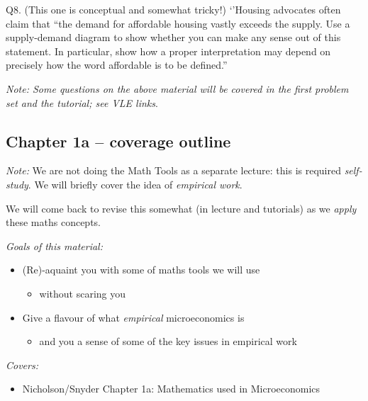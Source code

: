 \documentclass[]{article}
\providecommand{\tightlist}{%
  \setlength{\itemsep}{0pt}\setlength{\parskip}{0pt}}
\begin{document}
Q8. (This one is conceptual and somewhat tricky!) `'Housing advocates
often claim that ``the demand for affordable housing vastly exceeds the
supply. Use a supply-demand diagram to show whether you can make any
sense out of this statement. In particular, show how a proper
interpretation may depend on precisely how the word affordable is to be
defined.''

\emph{Note: Some questions on the above material will be covered in the
first problem set and the tutorial; see VLE links}.

\hypertarget{chapter-1a-coverage-outline}{%
\subsection{Chapter 1a -- coverage
outline}\label{chapter-1a-coverage-outline}}

\emph{Note:} We are not doing the Math Tools as a separate lecture: this
is required \emph{self-study}. We will briefly cover the idea of
\emph{empirical work}.

We will come back to revise this somewhat (in lecture and tutorials) as
we \emph{apply} these maths concepts.

\emph{Goals of this material:}

\begin{itemize}
\tightlist
\item
  (Re)-aquaint you with some of maths tools we will use

  \begin{itemize}
  \tightlist
  \item
    without scaring you
  \end{itemize}
\end{itemize}

\begin{itemize}
\tightlist
\item
  Give a flavour of what \emph{empirical} microeconomics is

  \begin{itemize}
  \tightlist
  \item
    and you a sense of some of the key issues in empirical work
  \end{itemize}
\end{itemize}

\bigskip

\emph{Covers:}

\begin{itemize}
\tightlist
\item
  Nicholson/Snyder Chapter 1a: Mathematics used in Microeconomics
\end{itemize}
\end{document}
